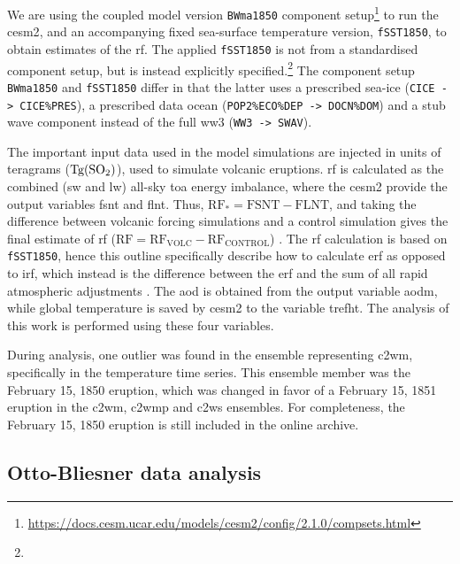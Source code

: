 \documentclass{ametsocV6.1}
\newcommand{\iso}[1][i]{{#1}njected \ce{SO2}}
\begin{document}
We are using the coupled model version \texttt{BWma1850} component
setup\footnote{\url{https://docs.cesm.ucar.edu/models/cesm2/config/2.1.0/compsets.html}}
to run the \gls{cesm2}, and an accompanying fixed sea-surface temperature version,
\texttt{fSST1850}, to obtain estimates of the \gls{rf}. The applied \texttt{fSST1850} is
not from a standardised component setup, but is instead explicitly
specified.\footnote{\fssturl} The component setup \texttt{BWma1850} and
\texttt{fSST1850} differ in that the latter uses a prescribed sea-ice (\texttt{CICE ->
  CICE\%PRES}), a prescribed data ocean (\texttt{POP2\%ECO\%DEP -> DOCN\%DOM}) and a stub
wave component instead of the full \gls{ww3} (\texttt{WW3 -> SWAV}).

The important input data used in the model simulations are \iso{} in units of teragrams
(\(\si{\tera\gram(\ce{SO2})}\)), used to simulate volcanic eruptions. \gls{rf} is
calculated as the combined (\gls{sw} and \gls{lw}) all-sky \gls{toa} energy imbalance,
where the \gls{cesm2} provide the output variables \gls{fsnt} and \gls{flnt}. Thus,
\(\mathrm{RF_*}= \mathrm{FSNT} - \mathrm{FLNT}\), and taking the difference between
volcanic forcing simulations and a control simulation gives the final estimate of
\gls{rf} (\(\mathrm{RF}=\mathrm{RF_{VOLC}}-\mathrm{RF_{CONTROL}}\))
\citep{marshall2020}. The \gls{rf} calculation is based on \texttt{fSST1850}, hence this
outline specifically describe how to calculate \gls{erf} as opposed to \gls{irf}, which
instead is the difference between the \gls{erf} and the sum of all rapid atmospheric
adjustments \citep{marshall2020,smith2018}. The \gls{aod} is obtained from the output
variable \gls{aodm}, while global temperature is saved by \gls{cesm2} to the variable
\gls{trefht}. The analysis of this work is performed using these four variables.

During analysis, one outlier was found in the ensemble representing \gls{c2wm},
specifically in the temperature time series. This ensemble member was the February 15,
1850 eruption, which was changed in favor of a February 15, 1851 eruption in the
\gls{c2wm}, \gls{c2wmp} and \gls{c2ws} ensembles. For completeness, the February 15,
1850 eruption is still included in the online archive.

\appendix[B]


\subsection{Otto-Bliesner data analysis}\label{ap:ob16}
\end{document}
